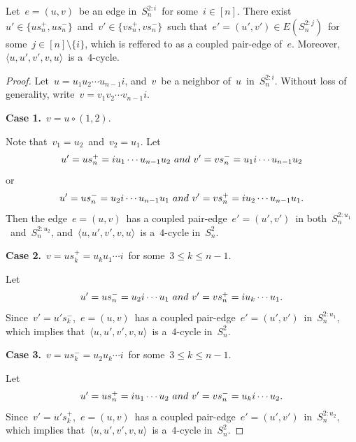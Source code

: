 \documentclass[10pt,a4paper]{amsart}
\begin{document}
	\begin{lemma}\label{8}
      		Let~$e=(u,v)$~be an edge in~$S_n^{2:i}$~for some~$i\in[n]$. There exist~$u'\in\{us_n^+,us_n^-\}$~and~$v'\in \{vs_n^+,vs_n^-\}$~such that~$e'=(u',v')\in E(S_n^{2:j})$~for some~$j\in[n]\setminus\{i\}$, which is reffered to as a coupled pair-edge of~$e$. Moreover,~$\langle u,u',v',v,u\rangle$~is a~$4$-cycle.
	\end{lemma}

	\begin{proof}
	Let~$u=u_1u_2\cdots u_{n-1}i$, and~$v$~be a neighbor of~$u$~in~$S_n^{2:i}$.
	Without loss of generality, write~$v=v_1v_2\cdots v_{n-1}i$.
	
	\medskip
	\noindent\textbf{Case 1.}~$v=u\circ(1,2)$.

    Note that~$v_1=u_2$~and~$v_2=u_1$.
	Let\[u' = u s_n^{+} =iu_1\cdots u_{n-1}u_2~{\rm and}~v' = v s_n^{-} = u_1i\cdots u_{n-1}u_2\]
	or\[u' = u s_n^{-} = u_2i\cdots u_{n-1}u_1~{\rm and}~v' = v s_n^{+} =iu_2\cdots u_{n-1}u_1.
	\]
	Then the edge~$e=(u,v)$~has a coupled pair-edge~$e'=(u',v')$~in both~$S_n^{2:u_1}$~and~$S_n^{2:u_2}$,
	and~$\langle u,u',v',v,u\rangle$~is a~$4$-cycle in~$S_n^2$.
	
	\medskip
	\noindent\textbf{Case 2.}~$v=us_k^{+}=u_k u_1\cdots i$~for some~$3\le k\le n-1$.
	
	Let
	\[
	u' = u s_n^{-} = u_2i\cdots u_1~{\rm and}~v' = vs_n^{+} =iu_k\cdots u_1.
	\]
	Since~$v'=u's_k^{-}$,~$e=(u,v)$~has a coupled pair-edge~$e'=(u',v')$~in~$S_n^{2:u_1}$, which implies that~$\langle u,u',v',v,u\rangle$~is a~$4$-cycle in~$S_n^2$.
	
	\medskip
	\noindent\textbf{Case 3.}~$v=us_k^{-}=u_2u_k\cdots i$~for some~$3\le k\le n-1$.
	
	Let
	\[
	u' = u s_n^{+} = iu_1\cdots u_2~{\rm and}~v' = vs_n^{-} =u_ki\cdots u_2.
	\]
	Since~$v'=u's_k^{+}$,~$e=(u,v)$~has a coupled pair-edge~$e'=(u',v')$~in~$S_n^{2:u_2}$, which implies that~$\langle u,u',v',v,u\rangle$~is a~$4$-cycle in~$S_n^2$.
	\end{proof}
\end{document}
